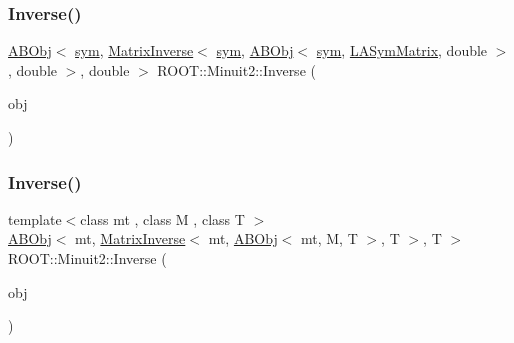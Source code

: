 \subsubsection{\texorpdfstring{Inverse()}{Inverse()}\hspace{0.1cm}{\footnotesize\ttfamily [1/2]}}
{\footnotesize\ttfamily \mbox{\hyperlink{classROOT_1_1Minuit2_1_1ABObj}{A\+B\+Obj}}$<$ \mbox{\hyperlink{classROOT_1_1Minuit2_1_1sym}{sym}}, \mbox{\hyperlink{classROOT_1_1Minuit2_1_1MatrixInverse}{Matrix\+Inverse}}$<$ \mbox{\hyperlink{classROOT_1_1Minuit2_1_1sym}{sym}}, \mbox{\hyperlink{classROOT_1_1Minuit2_1_1ABObj}{A\+B\+Obj}}$<$ \mbox{\hyperlink{classROOT_1_1Minuit2_1_1sym}{sym}}, \mbox{\hyperlink{classROOT_1_1Minuit2_1_1LASymMatrix}{L\+A\+Sym\+Matrix}}, double $>$, double $>$, double $>$ R\+O\+O\+T\+::\+Minuit2\+::\+Inverse (\begin{DoxyParamCaption}\item[{const \mbox{\hyperlink{classROOT_1_1Minuit2_1_1ABObj}{A\+B\+Obj}}$<$ \mbox{\hyperlink{classROOT_1_1Minuit2_1_1sym}{sym}}, \mbox{\hyperlink{classROOT_1_1Minuit2_1_1LASymMatrix}{L\+A\+Sym\+Matrix}}, double $>$ \&}]{obj }\end{DoxyParamCaption})\hspace{0.3cm}{\ttfamily [inline]}}

\mbox{\label{namespaceROOT_1_1Minuit2_a47a8185dbf2f2978dedb44abf3ab2e68}} 
\subsubsection{\texorpdfstring{Inverse()}{Inverse()}\hspace{0.1cm}{\footnotesize\ttfamily [2/2]}}
{\footnotesize\ttfamily template$<$class mt , class M , class T $>$ \\
\mbox{\hyperlink{classROOT_1_1Minuit2_1_1ABObj}{A\+B\+Obj}}$<$ mt, \mbox{\hyperlink{classROOT_1_1Minuit2_1_1MatrixInverse}{Matrix\+Inverse}}$<$ mt, \mbox{\hyperlink{classROOT_1_1Minuit2_1_1ABObj}{A\+B\+Obj}}$<$ mt, M, T $>$, T $>$, T $>$ R\+O\+O\+T\+::\+Minuit2\+::\+Inverse (\begin{DoxyParamCaption}\item[{const \mbox{\hyperlink{classROOT_1_1Minuit2_1_1ABObj}{A\+B\+Obj}}$<$ mt, M, T $>$ \&}]{obj }\end{DoxyParamCaption})\hspace{0.3cm}{\ttfamily [inline]}}

